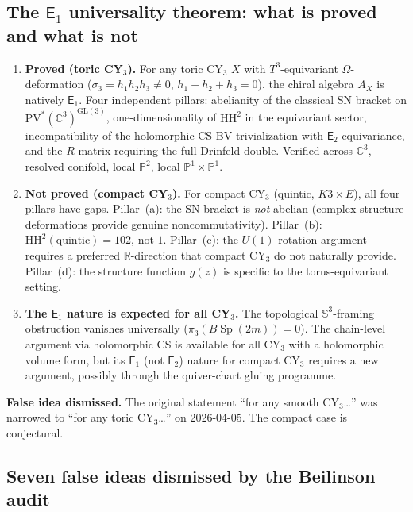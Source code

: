 \documentclass[11pt]{article}
\newcommand{\C}{\mathbb{C}}
\newcommand{\R}{\mathbb{R}}
\newcommand{\bP}{\mathbb{P}}
\newcommand{\bS}{\mathbb{S}}
\newcommand{\Eone}{\mathsf{E}_1}
\newcommand{\Etwo}{\mathsf{E}_2}
\newcommand{\HH}{\mathrm{HH}}
\newcommand{\Sp}{\operatorname{Sp}}
\begin{document}
\subsection{The $\Eone$ universality theorem: what is proved and what is not}
\label{subsec:e1-universality-scope}

\begin{enumerate}[label=(\alph*)]
\item \textbf{Proved (toric CY$_3$).} For any toric CY$_3$ $X$ with $T^3$-equivariant $\Omega$-deformation
 ($\sigma_3 = h_1 h_2 h_3 \neq 0$, $h_1 + h_2 + h_3 = 0$), the chiral algebra $A_X$ is natively $\Eone$.
 Four independent pillars: abelianity of the classical SN bracket on $\mathrm{PV}^*(\C^3)^{\mathrm{GL}(3)}$,
 one-dimensionality of $\HH^2$ in the equivariant sector, incompatibility of the holomorphic CS
 BV trivialization with $\Etwo$-equivariance, and the $R$-matrix requiring the full Drinfeld double.
 Verified across $\C^3$, resolved conifold, local $\bP^2$, local $\bP^1 \times \bP^1$.

\item \textbf{Not proved (compact CY$_3$).} For compact CY$_3$ (quintic, $K3 \times E$), all four pillars
 have gaps. Pillar~(a): the SN bracket is \emph{not} abelian (complex structure deformations
 provide genuine noncommutativity). Pillar~(b): $\HH^2(\mathrm{quintic}) = 102$, not $1$.
 Pillar~(c): the $U(1)$-rotation argument requires a preferred $\R$-direction that compact CY$_3$
 do not naturally provide. Pillar~(d): the structure function $g(z)$ is specific to the torus-equivariant setting.

\item \textbf{The $\Eone$ nature is expected for all CY$_3$.} The topological $\bS^3$-framing obstruction
 vanishes universally ($\pi_3(B\Sp(2m)) = 0$). The chain-level argument via holomorphic CS is
 available for all CY$_3$ with a holomorphic volume form, but its $\Eone$ (not $\Etwo$) nature
 for compact CY$_3$ requires a new argument, possibly through the quiver-chart gluing programme.
\end{enumerate}

\textbf{False idea dismissed.} The original statement ``for any smooth CY$_3$\ldots''
was narrowed to ``for any toric CY$_3$\ldots'' on 2026-04-05. The compact case is conjectural.

\subsection{Seven false ideas dismissed by the Beilinson audit}
\label{subsec:false-ideas-dismissed}
\end{document}
